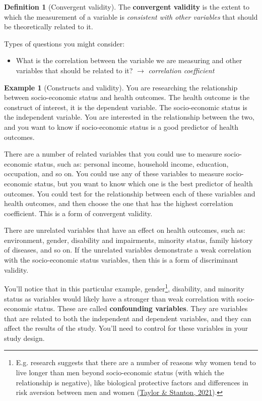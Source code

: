 \documentclass[
  11pt,
]{book}
\providecommand{\tightlist}{%
  \setlength{\itemsep}{0pt}\setlength{\parskip}{0pt}}
\theoremstyle{definition}
\newtheorem{definition}{Definition}[chapter]
\theoremstyle{definition}
\newtheorem{example}{Example}[chapter]
\theoremstyle{definition}
\theoremstyle{definition}
\theoremstyle{remark}
\begin{document}
\begin{definition}[Convergent validity]
\protect\hypertarget{def:defconvergentvalidity}{}\label{def:defconvergentvalidity}The \textbf{convergent validity} is the extent to which the measurement of a variable is \emph{consistent with other variables} that should be theoretically related to it.
\end{definition}

Types of questions you might consider:

\begin{itemize}
\tightlist
\item
  What is the correlation between the variable we are measuring and other variables that should be related to it? \(\rightarrow\) \emph{correlation coefficient}
\end{itemize}

\begin{example}[Constructs and validity]
\protect\hypertarget{exm:exconstructvalidity}{}\label{exm:exconstructvalidity}You are researching the relationship between socio-economic status and health outcomes. The health outcome is the construct of interest, it is the dependent variable. The socio-economic status is the independent variable. You are interested in the relationship between the two, and you want to know if socio-economic status is a good predictor of health outcomes.

There are a number of related variables that you could use to measure socio-economic status, such as: personal income, household income, education, occupation, and so on. You could use any of these variables to measure socio-economic status, but you want to know which one is the best predictor of health outcomes. You could test for the relationship between each of these variables and health outcomes, and then choose the one that has the highest correlation coefficient. This is a form of convergent validity.

There are unrelated variables that have an effect on health outcomes, such as: environment, gender, disability and impairments, minority status, family history of diseases, and so on. If the unrelated variables demonstrate a weak correlation with the socio-economic status variables, then this is a form of discriminant validity.

You'll notice that in this particular example, gender\footnote{E.g. research suggests that there are a number of reasons why women tend to live longer than men beyond socio-economic status (with which the relationship is negative), like biological protective factors and differences in risk aversion between men and women (\protect\hyperlink{ref-taylorHealthPsychology2021}{Taylor \& Stanton, 2021}).}, disability, and minority status as variables would likely have a stronger than weak correlation with socio-economic status. These are called \textbf{confounding variables}. They are variables that are related to both the independent and dependent variables, and they can affect the results of the study. You'll need to control for these variables in your study design.
\end{example}
\end{document}
